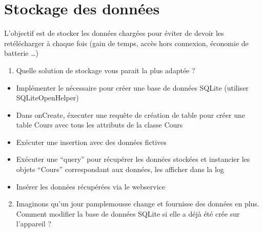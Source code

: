 \documentclass{article}
\begin{document}
\section{Stockage des données}
L'objectif est de stocker les données chargées pour éviter de devoir les
retélécharger à chaque fois (gain de temps, accès hors connexion, économie de
batterie \ldots)
\begin{enumerate}
 \setcounter{enumi}{0}
\item Quelle solution de stockage vous parait la plus adaptée ?
\end{enumerate}
\begin{itemize} 
  \item Implémenter le nécessaire pour créer une base de données SQLite
  (utiliser SQLiteOpenHelper)
  \item Dans onCreate, éxecuter une requête de création de table pour créer
  une table Cours avec tous les attributs de la classe Cours 
  \item Exécuter une insertion avec des données fictives
  \item Exécuter une ``query'' pour récupérer les données stockées et instancier
  les objets ``Cours'' correspondant aux données, les afficher dans la log
  \item Insérer les données récupérées via le webservice
\end{itemize}
\begin{enumerate}
 \setcounter{enumi}{1}
\item Imaginons qu'un jour pamplemousse change et fournisse des
données en plus.\\
Comment modifier la base de données SQLite si elle a déjà été crée sur l'appareil ?
\end{enumerate}
\end{document}
